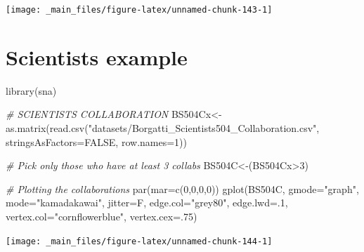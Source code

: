 \documentclass[
  notitlepage,
  onecolumn,
  openany]{book}
\newenvironment{Shaded}{\begin{snugshade}}{\end{snugshade}}
\newcommand{\AttributeTok}[1]{\textcolor[rgb]{0.77,0.63,0.00}{#1}}
\newcommand{\CommentTok}[1]{\textcolor[rgb]{0.56,0.35,0.01}{\textit{#1}}}
\newcommand{\ConstantTok}[1]{\textcolor[rgb]{0.00,0.00,0.00}{#1}}
\newcommand{\DecValTok}[1]{\textcolor[rgb]{0.00,0.00,0.81}{#1}}
\newcommand{\FunctionTok}[1]{\textcolor[rgb]{0.00,0.00,0.00}{#1}}
\newcommand{\NormalTok}[1]{#1}
\newcommand{\OtherTok}[1]{\textcolor[rgb]{0.56,0.35,0.01}{#1}}
\newcommand{\SpecialCharTok}[1]{\textcolor[rgb]{0.00,0.00,0.00}{#1}}
\newcommand{\StringTok}[1]{\textcolor[rgb]{0.31,0.60,0.02}{#1}}
\begin{document}
\begin{center}\texttt{[image: \_main\_files/figure-latex/unnamed-chunk-143-1]} \end{center}

\hypertarget{scientists-example}{%
\section{Scientists example}\label{scientists-example}}

\begin{Shaded}
\begin{Highlighting}[]
\FunctionTok{library}\NormalTok{(sna)}

\CommentTok{\# SCIENTISTS COLLABORATION}
\NormalTok{BS504Cx}\OtherTok{\textless{}{-}}\FunctionTok{as.matrix}\NormalTok{(}\FunctionTok{read.csv}\NormalTok{(}\StringTok{"datasets/Borgatti\_Scientists504\_Collaboration.csv"}\NormalTok{,}
                            \AttributeTok{stringsAsFactors=}\ConstantTok{FALSE}\NormalTok{, }\AttributeTok{row.names=}\DecValTok{1}\NormalTok{))}

\CommentTok{\# Pick only those who have at least 3 collabs}
\NormalTok{BS504C}\OtherTok{\textless{}{-}}\NormalTok{(BS504Cx}\SpecialCharTok{\textgreater{}}\DecValTok{3}\NormalTok{)}

\CommentTok{\# Plotting the collaborations}
\FunctionTok{par}\NormalTok{(}\AttributeTok{mar=}\FunctionTok{c}\NormalTok{(}\DecValTok{0}\NormalTok{,}\DecValTok{0}\NormalTok{,}\DecValTok{0}\NormalTok{,}\DecValTok{0}\NormalTok{))}
\FunctionTok{gplot}\NormalTok{(BS504C, }
      \AttributeTok{gmode=}\StringTok{"graph"}\NormalTok{,}
      \AttributeTok{mode=}\StringTok{"kamadakawai"}\NormalTok{,}
      \AttributeTok{jitter=}\NormalTok{F,}
      \AttributeTok{edge.col=}\StringTok{"grey80"}\NormalTok{, }
      \AttributeTok{edge.lwd=}\NormalTok{.}\DecValTok{1}\NormalTok{,}
      \AttributeTok{vertex.col=}\StringTok{"cornflowerblue"}\NormalTok{,}
      \AttributeTok{vertex.cex=}\NormalTok{.}\DecValTok{75}\NormalTok{)}
\end{Highlighting}
\end{Shaded}

\begin{center}\texttt{[image: \_main\_files/figure-latex/unnamed-chunk-144-1]} \end{center}
\end{document}
